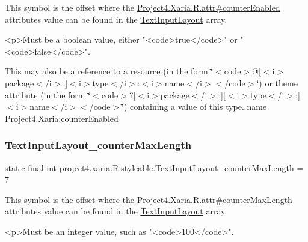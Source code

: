 This symbol is the offset where the \hyperlink{}{Project4.\+Xaria.\+R.\+attr\#counter\+Enabled} attribute\textquotesingle{}s value can be found in the \hyperlink{classproject4_1_1xaria_1_1R_1_1styleable_a5a2e4611c17d75c805194b416b9fed74}{Text\+Input\+Layout} array.

\begin{DoxyVerb}      <p>Must be a boolean value, either "<code>true</code>" or "<code>false</code>".
\end{DoxyVerb}
 

This may also be a reference to a resource (in the form \char`\"{}$<$code$>$@\mbox{[}$<$i$>$package$<$/i$>$\+:\mbox{]}$<$i$>$type$<$/i$>$\+:$<$i$>$name$<$/i$>$$<$/code$>$\char`\"{}) or theme attribute (in the form \char`\"{}$<$code$>$?\mbox{[}$<$i$>$package$<$/i$>$\+:\mbox{]}\mbox{[}$<$i$>$type$<$/i$>$\+:\mbox{]}$<$i$>$name$<$/i$>$$<$/code$>$\char`\"{}) containing a value of this type.  name Project4.\+Xaria\+:counter\+Enabled \mbox{\label{classproject4_1_1xaria_1_1R_1_1styleable_a48eeaeeae4c8fc24f978d05e0930288c}} 
\subsubsection{\texorpdfstring{Text\+Input\+Layout\+\_\+counter\+Max\+Length}{TextInputLayout\_counterMaxLength}}
{\footnotesize\ttfamily static final int project4.\+xaria.\+R.\+styleable.\+Text\+Input\+Layout\+\_\+counter\+Max\+Length = 7\hspace{0.3cm}{\ttfamily [static]}}

This symbol is the offset where the \hyperlink{}{Project4.\+Xaria.\+R.\+attr\#counter\+Max\+Length} attribute\textquotesingle{}s value can be found in the \hyperlink{classproject4_1_1xaria_1_1R_1_1styleable_a5a2e4611c17d75c805194b416b9fed74}{Text\+Input\+Layout} array.

\begin{DoxyVerb}      <p>Must be an integer value, such as "<code>100</code>".
\end{DoxyVerb}
 

